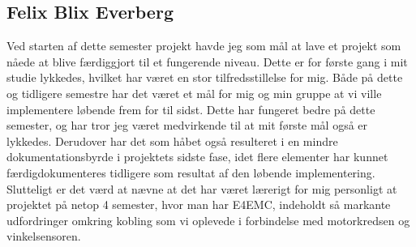 \subsection*{Felix Blix Everberg}
Ved starten af dette semester projekt havde jeg som mål at lave et projekt som nåede at blive færdiggjort til et fungerende niveau. Dette er for første gang i mit studie lykkedes, hvilket har været en stor tilfredsstillelse for mig. Både på dette og tidligere semestre har det været et mål for mig og min gruppe at vi ville implementere løbende frem for til sidst. Dette har fungeret bedre på dette semester, og har tror jeg været medvirkende til at mit første mål også er lykkedes. Derudover har det som håbet også resulteret i en mindre dokumentationsbyrde i projektets sidste fase, idet flere elementer har kunnet færdigdokumenteres tidligere som resultat af den løbende implementering. \\
Slutteligt er det værd at nævne at det har været lærerigt for mig personligt at projektet på netop 4 semester, hvor man har E4EMC, indeholdt så markante udfordringer omkring kobling som vi oplevede i forbindelse med motorkredsen og vinkelsensoren. \\
